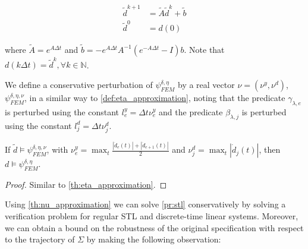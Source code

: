 \documentclass[oribibl]{llncs/llncs}
\newcommand*{\N}{\mathbb{N}}
\newcommand{\Always}{\mathbf{G}}
\begin{document}
\begin{equation}
    \label{eq:disc_system}
    \begin{aligned}
        \tilde d^{k+1} &= \tilde A \tilde d^k + \tilde b \\
        \tilde d^0 &= d(0)
    \end{aligned}
\end{equation}

where $\tilde A = e^{A \Delta t}$ and $\tilde b = - e^{A \Delta t} A^{-1} \left
( e^{- A \Delta t} - I \right ) b$. Note that $d(k \Delta t) = \tilde d^k,
\forall k \in \N$. 

We define a conservative perturbation of $\psi^{\delta, \eta}_{FEM}$ by a real
vector $\nu = (\nu^y, \nu^d)$, $\psi^{\delta, \eta, \nu}_{FEM}$, in a similar
way to \cref{def:eta_approximation}, noting that the predicate $\gamma_{\lambda, e}$ is perturbed
using the constant $l_e^y = \Delta t \nu^y_e$ and the predicate $\beta_{\lambda, j}$ is
perturbed using the constant $l_j^d = \Delta t \nu^d_j$.

\begin{theorem}
    \label{th:nu_approximation}
    If $\tilde d \models \psi^{\delta, \eta, \nu}_{FEM}$, with
    $\nu^y_e = \max_t \frac{|\dot d_e(t)| + |\dot d_{e+1}(t)|}{2}$ and $\nu^d_j = \max_t
    |\dot d_j(t)|$, then $d \models \psi^{\delta, \eta}_{FEM}$.
\end{theorem}
\begin{proof}
    Similar to \cref{th:eta_approximation}.
\end{proof}

Using \cref{th:nu_approximation} we can solve \cref{pr:stl}
conservatively by solving a verification problem for regular STL and discrete-time
linear systems. Moreover, we can obtain a bound on the robustness of the
original specification with respect to the trajectory of $\Sigma$ by making the
following observation:
\end{document}
